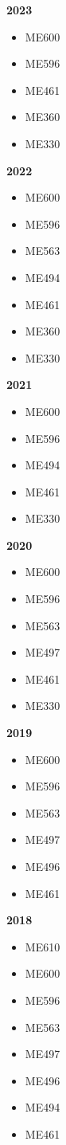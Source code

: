 \textbf{2023}
\begin{itemize}
  \item ME600
  \item ME596
  \item ME461
  \item ME360
  \item ME330
\end{itemize}

\textbf{2022}
\begin{itemize}
  \item ME600
  \item ME596
  \item ME563
  \item ME494
  \item ME461
  \item ME360
  \item ME330
\end{itemize}

\textbf{2021}
\begin{itemize}
  \item ME600
  \item ME596
  \item ME494
  \item ME461
  \item ME330
\end{itemize}

\textbf{2020}
\begin{itemize}
  \item ME600
  \item ME596
  \item ME563
  \item ME497
  \item ME461
  \item ME330
\end{itemize}

\textbf{2019}
\begin{itemize}
  \item ME600
  \item ME596
  \item ME563
  \item ME497
  \item ME496
  \item ME461
\end{itemize}

\textbf{2018}
\begin{itemize}
  \item ME610
  \item ME600
  \item ME596
  \item ME563
  \item ME497
  \item ME496
  \item ME494
  \item ME461
\end{itemize}

